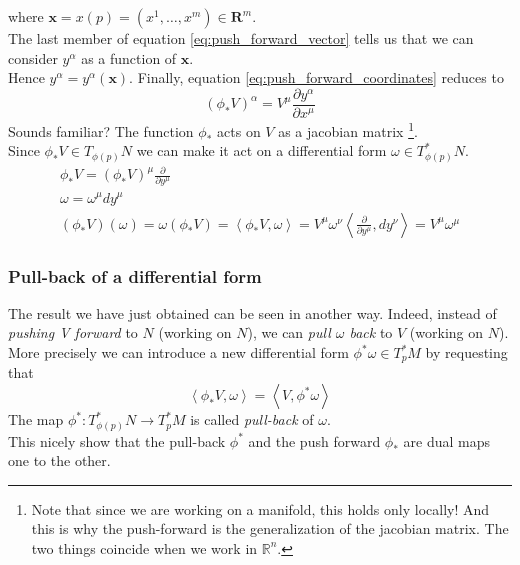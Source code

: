 \documentclass{article}
\begin{document}
where $\textbf{x} = x(p) = (x^1, \dots, x^m) \in \mathbf{R}^m$. \\
The last member of equation \ref{eq:push_forward_vector} tells us that we can consider $y^\alpha$ as a function of $\mathbf{x}$. \\
Hence $y^\alpha = y^{\alpha}(\mathbf{x})$. Finally, equation \ref{eq:push_forward_coordinates} reduces to 
\begin{equation*}
    (\phi_* V)^\alpha = V^\mu \frac{\partial y^\alpha}{\partial x^\mu}
\end{equation*}
Sounds familiar? The function $\phi_*$ acts on $V$ as a jacobian matrix \footnote{Note that since we are working on a manifold, this holds only locally! And this is why the push-forward is the generalization of the jacobian matrix. The two things coincide when we work in $\mathbb{R}^n$.}. \\
Since $\phi_* V \in T_{\phi(p)}N$ we can make it act on a differential form $\omega \in T_{\phi(p)}^*N$.
\begin{gather*}
    \phi_* V = (\phi_*V)^\mu \frac{\partial}{\partial y^\mu} \\
    \omega = \omega^\mu dy^\mu \\
    (\phi_* V)(\omega) = \omega(\phi_*V) = \left\langle \phi_*V, \omega \right\rangle = V^\mu \omega^\nu \left\langle\frac{\partial}{\partial y^\mu}, dy^\nu \right\rangle = V^\mu \omega^\mu
\end{gather*}

\subsubsection*{Pull-back of a differential form}
The result we have just obtained can be seen in another way. Indeed, instead of \emph{pushing V forward} to $N$ (working on $N$), we can \emph{pull $\omega$ back} to $V$ (working on $N$). More precisely
we can introduce a new differential form $\phi^*\omega \in T_p^* M$ by requesting that
\begin{equation*}
    \left\langle \phi_* V, \omega \right\rangle = \left\langle V, \phi^*\omega \right\rangle
\end{equation*}
The map $\phi^* : T_{\phi(p)}^* N \to T_p^* M$ is called \emph{pull-back} of $\omega$. \\
This nicely show that the pull-back $\phi^*$ and the push forward $\phi_*$ are dual maps one to the other.
\end{document}
